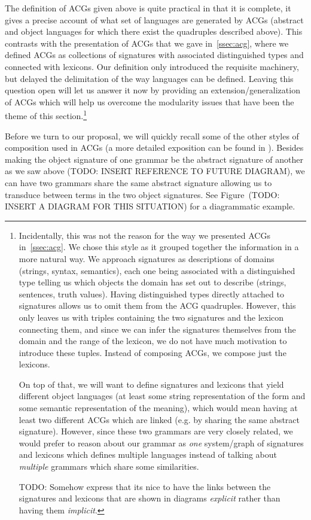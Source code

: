 The definition of ACGs given above is quite practical in that it is
complete, it gives a precise account of what set of languages are
generated by ACGs (abstract and object languages for which there exist
the quadruples described above). This contrasts with the presentation of
ACGs that we gave in~\ref{ssec:acg}, where we defined ACGs as
collections of signatures with associated distinguished types and
connected with lexicons. Our definition only introduced the requisite
machinery, but delayed the delimitation of the way languages can be
defined. Leaving this question open will let us answer it now by
providing an extension/generalization of ACGs which will help us
overcome the modularity issues that have been the theme of this
section.\footnote{Incidentally, this was not the reason for the way we
  presented ACGs in~\ref{ssec:acg}. We chose this style as it grouped
  together the information in a more natural way. We approach signatures
  as descriptions of domains (strings, syntax, semantics), each one
  being associated with a distinguished type telling us which objects
  the domain has set out to describe (strings, sentences, truth
  values). Having distinguished types directly attached to signatures
  allows us to omit them from the ACG quadruples. However, this only
  leaves us with triples containing the two signatures and the lexicon
  connecting them, and since we can infer the signatures themselves from
  the domain and the range of the lexicon, we do not have much
  motivation to introduce these tuples. Instead of composing ACGs, we
  compose just the lexicons.

On top of that, we will want to define signatures and lexicons that
yield different object languages (at least some string representation of
the form and some semantic representation of the meaning), which would
mean having at least two different ACGs which are linked (e.g. by
sharing the same abstract signature). However, since these two grammars
are very closely related, we would prefer to reason about our grammar as
\emph{one} system/graph of signatures and lexicons which defines
multiple languages instead of talking about \emph{multiple} grammars
which share some similarities.

TODO: Somehow express that its nice to have the links between the
signatures and lexicons that are shown in diagrams \emph{explicit}
rather than having them \emph{implicit}.}

Before we turn to our proposal, we will quickly recall some of the other
styles of composition used in ACGs (a more detailed exposition can be
found in \cite{pogodalla2012controlling}). Besides making the object
signature of one grammar be the abstract signature of another as we saw
above (TODO: INSERT REFERENCE TO FUTURE DIAGRAM), we can have two
grammars share the same abstract signature allowing us to transduce
between terms in the two object signatures. See Figure~(TODO: INSERT A
DIAGRAM FOR THIS SITUATION) for a diagrammatic example.


